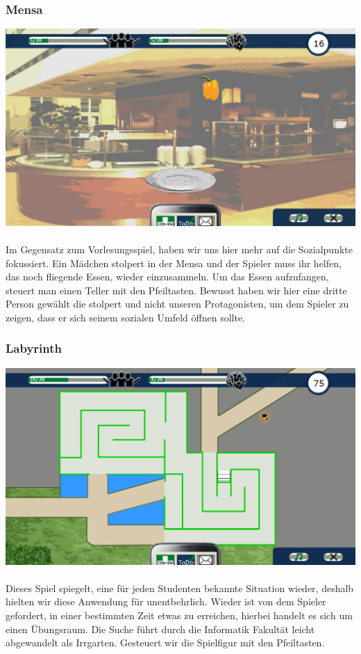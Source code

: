 \documentclass[a4paper, 11pt]{article} %
\begin{document}
\subsubsection{Mensa}
\includegraphics[scale=0.46]{images/spiel/mensa.png}\\\\
Im Gegensatz zum Vorlesungsspiel, haben wir uns hier mehr auf die Sozialpunkte fokussiert. Ein Mädchen stolpert in der Mensa und der Spieler muss ihr helfen, das noch fliegende Essen, wieder einzusammeln. Um das Essen aufzufangen, steuert man einen Teller mit den Pfeiltasten. Bewusst haben wir hier eine dritte Person gewählt die stolpert und nicht unseren Protagonisten, um dem Spieler zu zeigen, dass er sich seinem sozialen Umfeld öffnen sollte. 
\subsubsection{Labyrinth}
\includegraphics[scale=0.46]{images/spiel/labyrinth.png}\\\\
Dieses Spiel spiegelt, eine für jeden Studenten bekannte Situation wieder, deshalb hielten wir diese Anwendung für unentbehrlich. Wieder ist von dem Spieler gefordert, in einer bestimmten Zeit etwas zu erreichen, hierbei handelt es sich um einen Übungsraum. Die Suche führt durch die Informatik Fakultät leicht abgewandelt als Irrgarten. Gesteuert wir die Spielfigur mit den Pfeiltasten.
\end{document}
